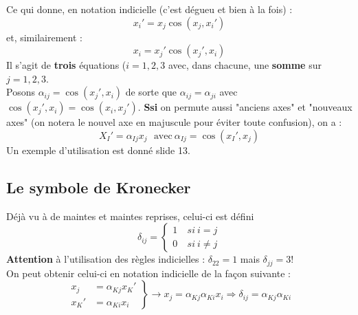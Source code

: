     Ce qui donne, en notation indicielle (c'est dégueu et bien à la fois) :
    \begin{equation}
    x_i' = x_j\cos(x_j,x_i')
    \end{equation}
    et, similairement :
    \begin{equation}
    x_i = x_j'\cos(x_j',x_i)
    \end{equation}
    Il s'agit de \textbf{trois} équations ($i=1,2,3$ avec, dans chacune, une \textbf{somme} sur 
    $j=1,2,3$.\\
    
    Posons $\alpha_{ij} = \cos(x_j',x_i)$ de sorte que $\alpha_{ij} = \alpha_{ji}$ avec $\cos(x_j',
    x_i) = \cos(x_i,x_j')$. \textbf{Ssi} on permute aussi "anciens axes" et "nouveaux axes" (on 
    notera le nouvel axe en majuscule pour éviter toute confusion), on a :
    \begin{equation}
    X_I' = \alpha_{Ij}x_j\ \ \ \text{avec}\ \alpha_{Ij} = \cos(x_I',x_j)
    \end{equation}
    Un exemple d'utilisation est donné slide 13.
    
    \subsection{Le symbole de Kronecker}
    Déjà vu à de maintes et maintes reprises, celui-ci est défini 
    \begin{equation}
    \delta_{ij} = \left\{\begin{array}{ll}
     1&\ si\ i=j  \\
     0&\ si\ i\neq j
    \end{array}\right.
    \end{equation}
    \textbf{Attention} à l'utilisation des règles indicielles : $\delta_{22} = 1$ mais $\delta_{jj}=3$!\\
    
    On peut obtenir celui-ci en notation indicielle de la façon suivante :
    \begin{equation}
    \left.\begin{array}{ll}
    x_j &= \alpha_{Kj}x_K'  \\
    x_K' &= \alpha_{Ki}x_i
    \end{array}\right\} \rightarrow x_j = \alpha_{Kj}\alpha_{Ki}x_i \Rightarrow \delta_{ij} = \alpha_{Kj}
    \alpha_{Ki}
    \end{equation}
    
